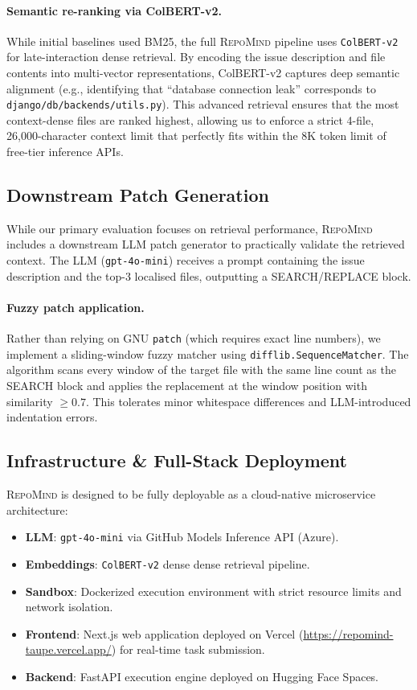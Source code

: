 \documentclass[11pt]{article}
\begin{document}
\paragraph{Semantic re-ranking via ColBERT-v2.}
While initial baselines used BM25, the full \textsc{RepoMind} pipeline uses
\texttt{ColBERT-v2}~\cite{khattab2020colbert} for late-interaction dense
retrieval. By encoding the issue description and file contents into
multi-vector representations, ColBERT-v2 captures deep semantic alignment
(e.g., identifying that ``database connection leak'' corresponds to
\texttt{django/db/backends/utils.py}). This advanced retrieval ensures that
the most context-dense files are ranked highest, allowing us to enforce a
strict 4-file, 26,000-character context limit that perfectly fits within
the 8K token limit of free-tier inference APIs.

\subsection{Downstream Patch Generation}

While our primary evaluation focuses on retrieval performance, \textsc{RepoMind} includes
a downstream LLM patch generator to practically validate the retrieved context. The LLM
(\texttt{gpt-4o-mini}) receives a prompt containing the issue description and the
top-3 localised files, outputting a SEARCH/REPLACE block.

\paragraph{Fuzzy patch application.}
Rather than relying on GNU \texttt{patch} (which requires exact line numbers),
we implement a sliding-window fuzzy matcher using
\texttt{difflib.SequenceMatcher}. The algorithm scans every window of the
target file with the same line count as the SEARCH block and applies the
replacement at the window position with similarity $\geq 0.7$. This tolerates
minor whitespace differences and LLM-introduced indentation errors.

\subsection{Infrastructure \& Full-Stack Deployment}

\textsc{RepoMind} is designed to be fully deployable as a cloud-native
microservice architecture:
\begin{itemize}
  \item \textbf{LLM}: \texttt{gpt-4o-mini} via GitHub Models Inference API (Azure).
  \item \textbf{Embeddings}: \texttt{ColBERT-v2} dense dense retrieval pipeline.
  \item \textbf{Sandbox}: Dockerized execution environment with strict resource
        limits and network isolation.
  \item \textbf{Frontend}: Next.js web application deployed on Vercel (\url{https://repomind-taupe.vercel.app/}) for
        real-time task submission.
  \item \textbf{Backend}: FastAPI execution engine deployed on Hugging Face
        Spaces.
\end{itemize}
\end{document}
